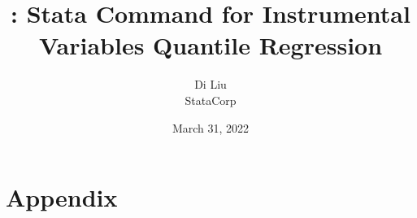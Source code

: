 \documentclass[12pt]{article}
\title{\ivqreg: Stata Command for Instrumental Variables Quantile Regression}
\author{Di Liu \\ StataCorp}
\date{March 31, 2022}
\begin{document}
\titlepage
\maketitle



\clearpage

\tableofcontents
\clearpage














\clearpage

\clearpage


\clearpage


\appendix
\section{Appendix}








\clearpage


\end{document}
